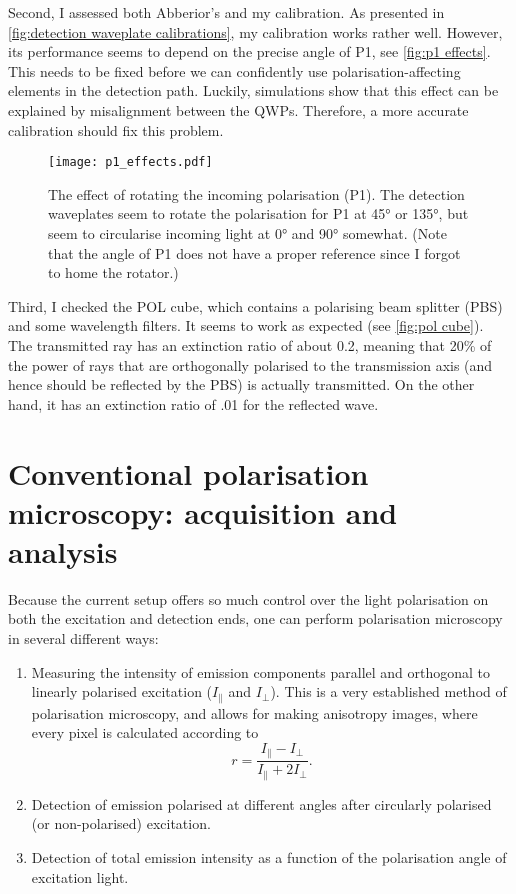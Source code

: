 Second, I assessed both Abberior's and my calibration. As presented in \autoref{fig:detection waveplate calibrations}, my calibration works rather well. However, its performance seems to depend on the precise angle of P1, see \autoref{fig:p1 effects}.
This needs to be fixed before we can confidently use polarisation-affecting elements in the detection path. Luckily, simulations show that this effect can be explained by misalignment between the QWPs. Therefore, a more accurate calibration should fix this problem.

\begin{figure}[h]
	\centering
	\texttt{[image: p1\_effects.pdf]}
	\caption{
		The effect of rotating the incoming polarisation (P1). The detection waveplates seem to rotate the polarisation for P1 at \ang{45} or \ang{135}, but seem to circularise incoming light at \ang{0} and \ang{90} somewhat. (Note that the angle of P1 does not have a proper reference since I forgot to home the rotator.)
	}
	\label{fig:p1 effects}
\end{figure}

Third, I checked the POL cube, which contains a polarising beam splitter (PBS) and some wavelength filters. It seems to work as expected (see \autoref{fig:pol cube}). The transmitted ray has an extinction ratio of about 0.2, meaning that 20\% of the power of rays that are orthogonally polarised to the transmission axis (and hence should be reflected by the PBS) is actually transmitted. On the other hand, it has an extinction ratio of .01 for the reflected wave.

\section{Conventional polarisation microscopy: acquisition and analysis}
\label{sec:pol analysis}
 
Because the current setup offers so much control over the light polarisation on both the excitation and detection ends, one can perform polarisation microscopy in several different ways:
\begin{enumerate}
	\item Measuring the intensity of emission components parallel and orthogonal to linearly polarised excitation ($ I_\parallel $ and $ I_\perp $). This is a very established method of polarisation microscopy, and allows for making anisotropy images, where every pixel is calculated according to
	\begin{equation}
		r=\frac{I_\parallel - I_\perp}{I_\parallel + 2I_\perp}.
	\end{equation}
	
	\item Detection of emission polarised at different angles after circularly polarised (or non-polarised) excitation.
	
	\item Detection of total emission intensity as a function of the polarisation angle of excitation light.
\end{enumerate}

